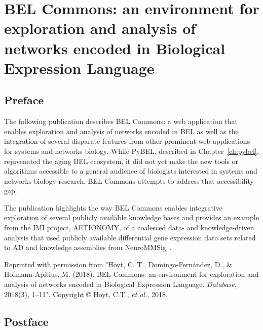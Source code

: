 \chapter{BEL Commons: an environment for exploration and analysis of networks encoded in Biological Expression Language}\label{ch:belcommons}

\section*{Preface}

The following publication describes BEL Commons: a web application that enables exploration and analysis of networks encoded in \ac{BEL} as well as the integration of several disparate features from other prominent web applications for systems and networks biology.
While PyBEL, described in Chapter~\ref{ch:pybel}, rejuvenated the aging \ac{BEL} ecosystem, it did not yet make the new tools or algorithms accessible to a general audience of biologists interested in systems and networks biology research.
BEL Commons attempts to address that accessibility gap.

The publication highlights the way BEL Commons enables integrative exploration of several publicly available knowledge bases and provides an example from the \ac{IMI} project, AETIONOMY, of a coalesced data- and knowledge-driven analysis that used publicly available differential gene expression data sets related to \ac{AD} and knowledge assemblies from NeuroMMSig~\cite{Domingo-Fernandez2017}.

\vspace*{\fill}

Reprinted with permission from "Hoyt, C. T., Domingo-Fern\'{a}ndez, D., \& Hofmann-Apitius, M. (2018). BEL Commons: an environment for exploration and analysis of networks encoded in Biological Expression Language. \textit{Database}, 2018(3), 1–11".
Copyright © Hoyt, C.T., \textit{et al.}, 2018.



\section*{Postface}

